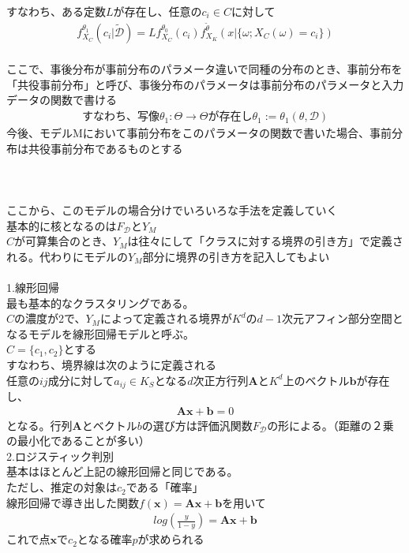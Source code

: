 \documentclass{jsarticle}
\begin{document}
すなわち、ある定数$L$が存在し、任意の$c_i\in C$に対して
\begin{eqnarray}
f^{\theta_1}_{X_C}(c_i|\tilde{\mathcal{D}})=Lf^{\theta_0}_{X_C}(c_i)f^{\tilde{\theta}}_{X_K}(x|\{\omega;X_C(\omega)=c_i\})
\end{eqnarray}
　\\
ここで、事後分布が事前分布のパラメータ違いで同種の分布のとき、事前分布を「共役事前分布」と呼び、事後分布のパラメータは事前分布のパラメータと入力データの関数で書ける
\begin{eqnarray}
すなわち、写像\theta_1:\Theta\rightarrow\Theta が存在し  \theta_1:=\theta_1(\theta,\mathcal{D})
\end{eqnarray}
今後、モデルMにおいて事前分布をこのパラメータの関数で書いた場合、事前分布は共役事前分布であるものとする\\
　\\
　\\
\scalebox{1.1}{3.分類}\\
ここから、このモデルの場合分けでいろいろな手法を定義していく\\
基本的に核となるのは$F_\mathcal{D}$と$Y_M$\\
$C$が可算集合のとき、$Y_M$は往々にして「クラスに対する境界の引き方」で定義される。代わりにモデルの$Y_M$部分に境界の引き方を記入してもよい\\
　\\
1.線形回帰\\
最も基本的なクラスタリングである。\\
$C$の濃度が2で、$Y_M$によって定義される境界が$K^d$の$d-1$次元アフィン部分空間となるモデルを線形回帰モデルと呼ぶ。\\
$C=\{c_1,c_2\}$とする\\
すなわち、境界線は次のように定義される\\
任意の$ij$成分に対して$a_{ij}\in K_S$となる$d$次正方行列$\bm{A}$と$K^d$上のベクトル$\bm{b}$が存在し、
\begin{eqnarray}
\bm{A}\bm{x}+\bm{b}=0
\end{eqnarray}
となる。行列$\bm{A}$とベクトル$b$の選び方は評価汎関数$F_{\mathcal{D}}$の形による。（距離の２乗の最小化であることが多い）\\

2.ロジスティック判別\\
基本はほとんど上記の線形回帰と同じである。\\
ただし、推定の対象は$c_2$である「確率」\\
線形回帰で導き出した関数$f(\bm{x})=\bm{A}\bm{x}+\bm{b}$を用いて
\begin{eqnarray}
log(\frac{y}{1-y})=\bm{A}\bm{x}+\bm{b}
\end{eqnarray}
これで点$\bm{x}$で$c_2$となる確率$p$が求められる
\end{document}
